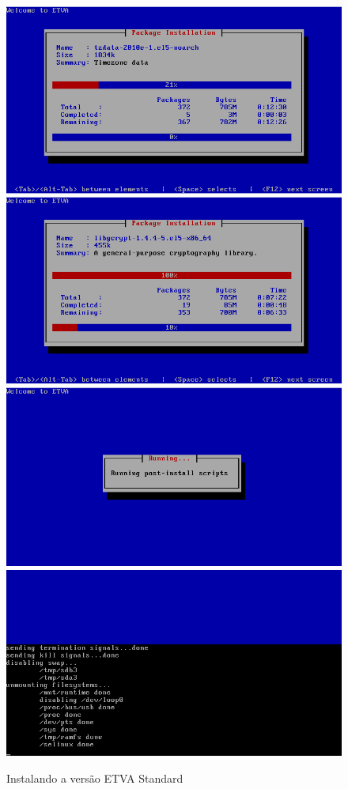 \begin{figure}[H]
\begin{center}
    \includegraphics[scale=0.4]{screenshots/install_etva6.png}        
    \includegraphics[scale=0.4]{screenshots/install_etva8.png}
    \includegraphics[scale=0.4]{screenshots/install_etva9.png}
    \includegraphics[scale=0.4]{screenshots/install_etva10.png}
\caption{Instalando a versão ETVA Standard}
	\label{fig:installation_standard}
	\end{center}
\end{figure}

